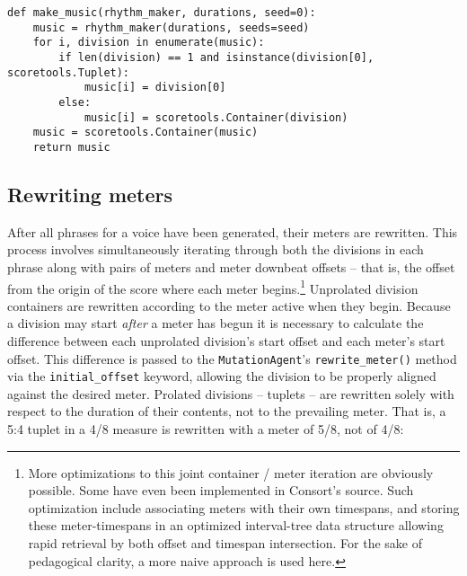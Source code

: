 \begin{singlespacing}
\vspace{-0.5\baselineskip}
\begin{lstlisting}
def make_music(rhythm_maker, durations, seed=0):
    music = rhythm_maker(durations, seeds=seed)
    for i, division in enumerate(music):
        if len(division) == 1 and isinstance(division[0], scoretools.Tuplet):
            music[i] = division[0]
        else:
            music[i] = scoretools.Container(division)
    music = scoretools.Container(music)
    return music
\end{lstlisting}
\end{singlespacing}

\subsection{Rewriting meters}

After all phrases for a voice have been generated, their meters are rewritten.
This process involves simultaneously iterating through both the divisions in
each phrase along with pairs of meters and meter downbeat offsets -- that is,
the offset from the origin of the score where each meter begins.\footnote{More
optimizations to this joint container / meter iteration are obviously possible.
Some have even been implemented in Consort's source. Such optimization include
associating meters with their own timespans, and storing these meter-timespans
in an optimized interval-tree data structure allowing rapid retrieval by both
offset and timespan intersection. For the sake of pedagogical clarity, a more
naive approach is used here.} Unprolated division containers are rewritten
according to the meter active when they begin. Because a division may start
\emph{after} a meter has begun it is necessary to calculate the difference
between each unprolated division's start offset and each meter's start offset.
This difference is passed to the \texttt{MutationAgent}'s
\texttt{rewrite\_meter()} method via the \texttt{initial\_offset} keyword,
allowing the division to be properly aligned against the desired meter.
Prolated divisions -- tuplets -- are rewritten solely with respect to the
duration of their contents, not to the prevailing meter. That is, a 5:4 tuplet
in a 4/8 measure is rewritten with a meter of 5/8, not of 4/8:

\begin{comment}
<abjadextract dissertation.py.time_tools:rewrite_meters />[strip_prompt]
\end{comment}

